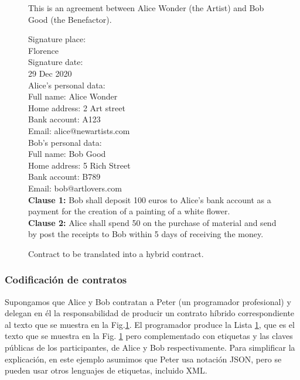 \documentclass[12pt]{report} %
\begin{document}
\begin{figure}
\begin{tcolorbox}[width=\textwidth,
   title={This is ...},
   colframe=black!75!white,
   colbacktitle=gray!50!white, coltitle=black,
   colupper=black,    colback=green!5!white]

 This is an agreement between Alice Wonder (the Artist) and Bob Good (the Benefactor). 

\vspace{0.5cm}
Signature place:\\
Florence\\

Signature date:\\
29 Dec 2020 \\

Alice's personal data: \\
Full name:  Alice Wonder \\
Home address: 2 Art street \\
Bank account: A123 \\
Email: alice@newartists.com \\


Bob's personal data:\\
Full name: Bob Good \\
Home address: 5 Rich Street \\
Bank account: B789 \\
Email: bob@artlovers.com \\



\textbf{Clause 1:}  
Bob shall deposit 100 euros to Alice's bank account as a 
payment for the creation of a painting of a white flower. \\

\textbf{Clause 2:}  
Alice shall spend 50 on the purchase of material and send by
post the receipts to Bob within 5 days of receiving the money.
\end{tcolorbox}
\caption{Contract to be translated into a hybrid contract.}
\label{box:conthybrid}
\end{figure}




\subsubsection{Codificación de contratos}

Supongamos que Alice y Bob contratan a Peter (un programador profesional) y delegan en él la responsabilidad de producir un contrato híbrido correspondiente al texto que se muestra en la Fig.\ref{box:conthybrid}. El programador produce la Lista \ref{box:conthybrid}, que es el texto que se muestra en la Fig. \ref{box:conthybrid} pero complementado con etiquetas y las claves públicas de los participantes, de Alice y Bob respectivamente. Para simplificar la explicación, en este ejemplo asumimos que Peter usa notación JSON, pero se pueden usar otros lenguajes de etiquetas, incluido XML.
\end{document}
